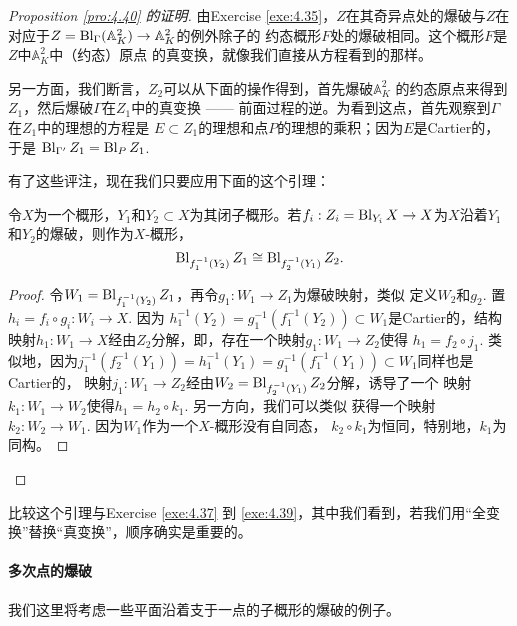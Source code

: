\begin{proof}[Proposition \ref{pro:4.40} 的证明]
由Exercise \ref{exe:4.35}，$Z$在其奇异点处的爆破与$Z$在
对应于$Z=\operatorname{Bl}_\Gamma (\mathbb A_K^2)\to \mathbb A_K^2$的例外除子的
约态概形$F$处的爆破相同。这个概形$F$是$Z$中$\mathbb A_K^2$中（约态）原点
的真变换，就像我们直接从方程看到的那样。

另一方面，我们断言，$Z_2$可以从下面的操作得到，首先爆破$\mathbb A_K^2$
的约态原点来得到$Z_1$，然后爆破$\Gamma$在$Z_1$中的真变换 ------
前面过程的逆。\nottran 为看到这点，首先观察到$\Gamma$在$Z_1$中的理想的方程是
$E\subset Z_1$的理想和点$P$的理想的乘积；因为$E$是Cartier的，于是
$\operatorname{Bl}_{\Gamma'}Z_1=\operatorname{Bl}_P Z_1$.

有了这些评注，现在我们只要应用下面的这个引理：

\begin{lem}\label{lem:4.41}
	令$X$为一个概形，$Y_1$和$Y_2\subset X$为其闭子概形。若$f_i:Z_i=\operatorname{Bl}_{Y_i}X\to X$为$X$沿着$Y_1$和$Y_2$的爆破，则作为$X$-概形，
	\[
		\operatorname{Bl}_{f_1^{-1}(Y_2)}Z_1 \cong \operatorname{Bl}_{f_2^{-1}(Y_1)}Z_2.
	\]
\end{lem}

\begin{proof}
令$W_1=\operatorname{Bl}_{f_1^{-1}(Y_2)}Z_1$，再令$g_1:W_1\to Z_1$为爆破映射，类似
定义$W_2$和$g_2$. 置$h_i=f_i\circ g_i:W_i\to X$. 因为
$h_1^{-1}(Y_2)=g_1^{-1}(f_1^{-1}(Y_2))\subset W_1$是Cartier的，结构
映射$h_1:W_1\to X$经由$Z_2$分解，即，存在一个映射$g_1:W_1\to Z_2$使得
$h_1=f_2\circ j_1$. 类似地，因为$j_1^{-1}(f_2^{-1}(Y_1))=
h_1^{-1}(Y_1)=g_1^{-1}(f_1^{-1}(Y_1))\subset W_1$同样也是Cartier的，
映射$j_1:W_1\to Z_2$经由$W_2=\operatorname{Bl}_{f_2^{-1}(Y_1)}Z_2$分解，诱导了一个
映射$k_1:W_1\to W_2$使得$h_1=h_2\circ k_1$. 另一方向，我们可以类似
获得一个映射$k_2:W_2\to W_1$. 因为$W_1$作为一个$X$-概形没有自同态，
$k_2\circ k_1$为恒同，特别地，$k_1$为同构。
\renewcommand{\qedsymbol}{}
\end{proof}

\renewcommand{\qedsymbol}{$\square\hspace{-1.9ex}\square$}
\end{proof}\renewcommand{\qedsymbol}{$\square$}

比较这个引理与Exercise \ref{exe:4.37} 到 \ref{exe:4.39}，其中我们看到，若我们用“全变换”替换“真变换”，顺序确实是重要的。

\paragraph*{多次点的爆破} 我们这里将考虑一些平面沿着支于一点的子概形的爆破的例子。

